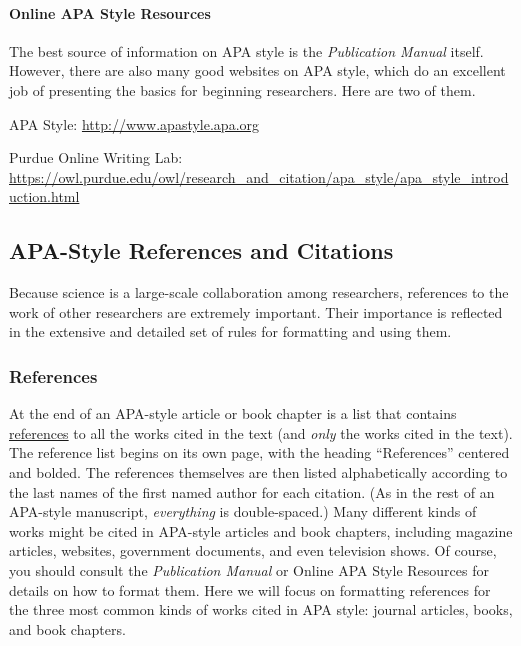 \documentclass[
]{krantz}
\begin{document}
\hypertarget{online-apa-style-resources}{%
\paragraph*{Online APA Style Resources}\label{online-apa-style-resources}}

The best source of information on APA style is the \emph{Publication Manual} itself. However, there are also many good websites on APA style, which do an excellent job of presenting the basics for beginning researchers. Here are two of them.

APA Style: \url{http://www.apastyle.apa.org}

Purdue Online Writing Lab: \url{https://owl.purdue.edu/owl/research_and_citation/apa_style/apa_style_introduction.html}

\hypertarget{apa-style-references-and-citations}{%
\subsection*{APA-Style References and Citations}\label{apa-style-references-and-citations}}


Because science is a large-scale collaboration among researchers, references to the work of other researchers are extremely important. Their importance is reflected in the extensive and detailed set of rules for formatting and using them.

\hypertarget{references}{%
\subsubsection*{References}\label{references}}


At the end of an APA-style article or book chapter is a list that contains \protect\hyperlink{reference}{references} to all the works cited in the text (and \emph{only} the works cited in the text). The reference list begins on its own page, with the heading ``References'' centered and bolded. The references themselves are then listed alphabetically according to the last names of the first named author for each citation. (As in the rest of an APA-style manuscript, \emph{everything} is double-spaced.) Many different kinds of works might be cited in APA-style articles and book chapters, including magazine articles, websites, government documents, and even television shows. Of course, you should consult the \emph{Publication Manual} or Online APA Style Resources for details on how to format them. Here we will focus on formatting references for the three most common kinds of works cited in APA style: journal articles, books, and book chapters.
\end{document}
